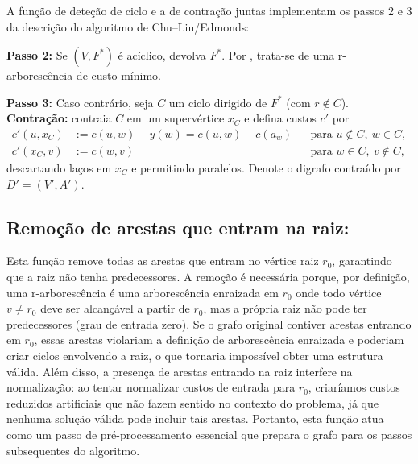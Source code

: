 A função de deteção de ciclo e a de contração juntas implementam os passos 2 e 3 da descrição do algoritmo de Chu–Liu/Edmonds:

\begin{tcolorbox}[
        enhanced, breakable,
        colframe=green!60!black, colback=green!5,
        colbacktitle=green!20, coltitle=black,
        title={Passos 2 e 3 do Algoritmo de Chu–Liu/Edmonds},
        boxed title style={sharp corners, boxrule=0.6pt},
        sharp corners, boxrule=0.6pt
    ]
    \textbf{Passo 2:} Se \((V,F^*)\) é acíclico, devolva \(F^*\). Por \cite[Obs.~4.36]{kleinberg2006}, trata-se de uma r-arborescência de custo mínimo.

    \textbf{Passo 3:} Caso contrário, seja \(C\) um ciclo dirigido de \(F^*\) (com \(r\notin C\)). \textbf{Contração:} contraia \(C\) em um supervértice \(x_C\) e defina custos \(c'\) por
    \begin{align*}
        c'(u,x_C) & := c(u,w) - y(w) = c(u,w) - c(a_w) &  & \text{para } u\notin C,\ w\in C, \\
        c'(x_C,v) & := c(w,v)                          &  & \text{para } w\in C,\ v\notin C,
    \end{align*}
    descartando laços em \(x_C\) e permitindo paralelos. Denote o digrafo contraído por \(D'=(V',A')\).
\end{tcolorbox}

\subsection{Remoção de arestas que entram na raiz:}
Esta função remove todas as arestas que entram no vértice raiz \(r_0\), garantindo que a raiz não tenha predecessores. A remoção é necessária porque, por definição, uma r-arborescência é uma arborescência enraizada em \(r_0\) onde todo vértice \(v \neq r_0\) deve ser alcançável a partir de \(r_0\), mas a própria raiz não pode ter predecessores (grau de entrada zero). Se o grafo original contiver arestas entrando em \(r_0\), essas arestas violariam a definição de arborescência enraizada e poderiam criar ciclos envolvendo a raiz, o que tornaria impossível obter uma estrutura válida. Além disso, a presença de arestas entrando na raiz interfere na normalização: ao tentar normalizar custos de entrada para \(r_0\), criaríamos custos reduzidos artificiais que não fazem sentido no contexto do problema, já que nenhuma solução válida pode incluir tais arestas. Portanto, esta função atua como um passo de pré-processamento essencial que prepara o grafo para os passos subsequentes do algoritmo.

